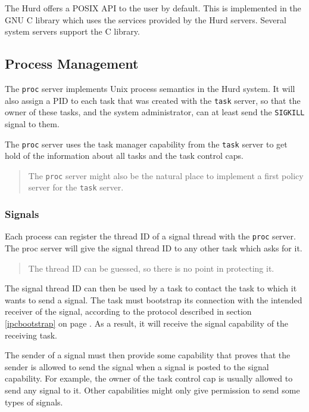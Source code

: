 \documentclass[9pt,a4paper]{extarticle}
\newenvironment{comment}{\footnotesize \begin{quote}}{\end{quote}}
\begin{document}
The Hurd offers a POSIX API to the user by default.  This is
implemented in the GNU C library which uses the services provided by
the Hurd servers.  Several system servers support the C library.


\subsection{Process Management}
\label{proc}

The \texttt{proc} server implements Unix process semantics in the Hurd
system.  It will also assign a PID to each task that was created with
the \texttt{task} server, so that the owner of these tasks, and the
system administrator, can at least send the \verb/SIGKILL/ signal to
them.

The \texttt{proc} server uses the task manager capability from the
\texttt{task} server to get hold of the information about all tasks
and the task control caps.

\begin{comment}
  The \texttt{proc} server might also be the natural place to
  implement a first policy server for the \texttt{task} server.
\end{comment}


\subsubsection{Signals}
\label{signals}

Each process can register the thread ID of a signal thread with the
\texttt{proc} server.  The proc server will give the signal thread ID
to any other task which asks for it.

\begin{comment}
  The thread ID can be guessed, so there is no point in protecting it.
\end{comment}

The signal thread ID can then be used by a task to contact the task to
which it wants to send a signal.  The task must bootstrap its
connection with the intended receiver of the signal, according to the
protocol described in section \ref{ipcbootstrap} on page
\pageref{ipcbootstrap}.  As a result, it will receive the signal
capability of the receiving task.

The sender of a signal must then provide some capability that proves
that the sender is allowed to send the signal when a signal is posted
to the signal capability.  For example, the owner of the task control
cap is usually allowed to send any signal to it.  Other capabilities
might only give permission to send some types of signals.
\end{document}
